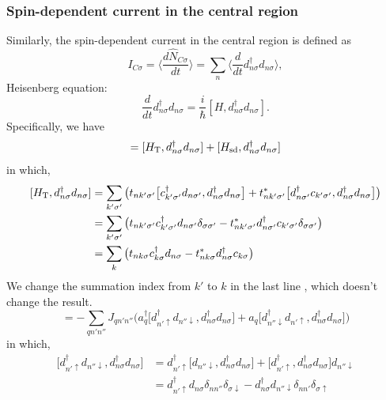 \documentclass[aps,prb,superscriptaddress]{revtex4-2}
\begin{document}
\subsubsection{Spin-dependent current in the central region}
Similarly, the spin-dependent current in the central region is defined as
\begin{equation}
I_{C\sigma} = \langle\frac{d\hat N_{C\sigma}}{dt} \rangle=  \sum_{n}\langle \frac{d}{dt} d_{n\sigma}^{\dag}d_{n\sigma}\rangle,
\end{equation}
Heisenberg equation:
\begin{equation}
\frac{d}{dt} d_{n\sigma}^{\dag}d_{n\sigma} = \frac{i}{\hbar} [H, d_{n\sigma}^{\dag}d_{n\sigma}].
\end{equation}
Specifically, we have
\begin{equation}
 [H, d_{n\sigma}^{\dag}d_{n\sigma}] = [H_{\rm T},  d_{n\sigma}^{\dag}d_{n\sigma}] + [H_{\rm sd},  d_{n\sigma}^{\dag}d_{n\sigma}]
\end{equation}
in which,
\begin{equation}
\begin{split}
[H_{\rm T},  d_{n\sigma}^{\dag}d_{n\sigma}] &= \sum_{k'\sigma'}\big(t_{nk'\sigma'} \big[c_{k'\sigma'}^{\dag}d_{n\sigma'},  d_{n\sigma}^{\dag}d_{n\sigma}\big] + t_{nk'\sigma'}^{*} \big[d_{n\sigma'}^{\dag}c_{k'\sigma'},  d_{n\sigma}^{\dag}d_{n\sigma}\big] \big) \\
&  = \sum_{k'\sigma'}\big(t_{nk'\sigma'} c_{k'\sigma'}^{\dag}d_{n\sigma'}\delta_{\sigma\sigma'} - t_{nk'\sigma'}^{*} d_{n\sigma'}^{\dag}c_{k'\sigma'} \delta_{\sigma\sigma'}\big) \\
&= \sum_{k}\big(t_{nk\sigma} c_{k\sigma}^{\dag}d_{n\sigma} - t_{nk\sigma}^{*} d_{n\sigma}^{\dag}c_{k\sigma} \big)
\end{split}
\end{equation}
We change the summation index from $k'$ to $k$ in the last line , which doesn't change the result.
\begin{equation}
[H_{\rm sd},  d_{n\sigma}^{\dag}d_{n\sigma}] = -\sum_{qn'n''}J_{qn'n''}\big( a_{q}^{\dag} \big[d_{n'\uparrow}^{\dag}d_{n''\downarrow}, d_{n\sigma}^{\dag}d_{n\sigma} \big] + a_{q}\big[d_{n''\downarrow}^{\dag}d_{n'\uparrow}, d_{n\sigma}^{\dag}d_{n\sigma} \big]\big)
\end{equation}
in which,
\begin{equation}
\begin{split}
\big[d_{n'\uparrow}^{\dag}d_{n''\downarrow}, d_{n\sigma}^{\dag}d_{n\sigma} \big] &= d_{n'\uparrow}^{\dag} \big[d_{n''\downarrow}, d_{n\sigma}^{\dag}d_{n\sigma}\big] + \big[d_{n'\uparrow}^{\dag} , d_{n\sigma}^{\dag}d_{n\sigma} \big]d_{n''\downarrow} \\
&=d_{n'\uparrow}^{\dag}d_{n\sigma}\delta_{nn''}\delta_{\sigma \downarrow} - d_{n\sigma}^{\dag}d_{n''\downarrow}\delta_{nn'}\delta_{\sigma \uparrow}
\end{split}
\end{equation}
\end{document}
